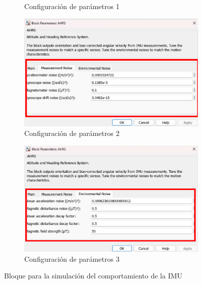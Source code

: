 \begin{figure}[htbp]
\begin{subfigure}[b]{0.45\textwidth}
        \caption{Configuración de parámetros 1}
        \label{fig:parametros_AHRS_01}
    \end{subfigure}
    \hfill
    \begin{subfigure}[b]{0.45\textwidth}
        \centering
        \includegraphics[width=\textwidth]{fig/Capitulo5/Caso_de_estudio_IMU/Generador_de_salidas/configuracion_AHRS_02.pdf}
        \caption{Configuración de parámetros 2}
        \label{fig:parametros_AHRS_02}
    \end{subfigure}
    \hfill
    \begin{subfigure}[b]{0.45\textwidth}
        \centering
        \includegraphics[width=\textwidth]{fig/Capitulo5/Caso_de_estudio_IMU/Generador_de_salidas/configuracion_AHRS_03.pdf}
        \caption{Configuración de parámetros 3}
        \label{fig:parametros_AHRS_03}
    \end{subfigure}

    \caption{Bloque para la simulación del comportamiento de la IMU}
    \label{fig:arreglo_AHRS}
\end{figure}

